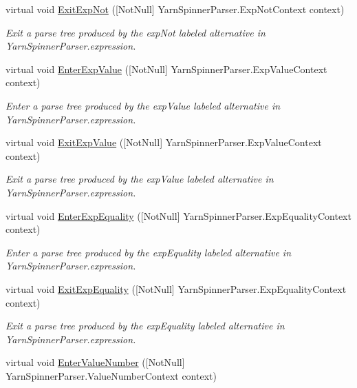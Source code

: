 \begin{DoxyCompactItemize}
virtual void \hyperlink{a00196_afba9f6d1f3ede7b042a34ef3bc7b67bb}{Exit\-Exp\-Not} (\mbox{[}Not\-Null\mbox{]} Yarn\-Spinner\-Parser.\-Exp\-Not\-Context context)
\begin{DoxyCompactList}\small\item\em Exit a parse tree produced by the {\ttfamily exp\-Not} labeled alternative in Yarn\-Spinner\-Parser.\-expression. \end{DoxyCompactList}\item 
virtual void \hyperlink{a00196_a72f405648a0cee5cbd9adf15981fb1ff}{Enter\-Exp\-Value} (\mbox{[}Not\-Null\mbox{]} Yarn\-Spinner\-Parser.\-Exp\-Value\-Context context)
\begin{DoxyCompactList}\small\item\em Enter a parse tree produced by the {\ttfamily exp\-Value} labeled alternative in Yarn\-Spinner\-Parser.\-expression. \end{DoxyCompactList}\item 
virtual void \hyperlink{a00196_a721acce8447553c78f8603381a30295f}{Exit\-Exp\-Value} (\mbox{[}Not\-Null\mbox{]} Yarn\-Spinner\-Parser.\-Exp\-Value\-Context context)
\begin{DoxyCompactList}\small\item\em Exit a parse tree produced by the {\ttfamily exp\-Value} labeled alternative in Yarn\-Spinner\-Parser.\-expression. \end{DoxyCompactList}\item 
virtual void \hyperlink{a00196_a56be9d851c42ae93e2f47e5f8a5d7677}{Enter\-Exp\-Equality} (\mbox{[}Not\-Null\mbox{]} Yarn\-Spinner\-Parser.\-Exp\-Equality\-Context context)
\begin{DoxyCompactList}\small\item\em Enter a parse tree produced by the {\ttfamily exp\-Equality} labeled alternative in Yarn\-Spinner\-Parser.\-expression. \end{DoxyCompactList}\item 
virtual void \hyperlink{a00196_a95e59996fc8cf316f487c99084228cae}{Exit\-Exp\-Equality} (\mbox{[}Not\-Null\mbox{]} Yarn\-Spinner\-Parser.\-Exp\-Equality\-Context context)
\begin{DoxyCompactList}\small\item\em Exit a parse tree produced by the {\ttfamily exp\-Equality} labeled alternative in Yarn\-Spinner\-Parser.\-expression. \end{DoxyCompactList}\item 
virtual void \hyperlink{a00196_afdedf143e349fc3d45837f63bfecc1c8}{Enter\-Value\-Number} (\mbox{[}Not\-Null\mbox{]} Yarn\-Spinner\-Parser.\-Value\-Number\-Context context)

\end{DoxyCompactItemize}
